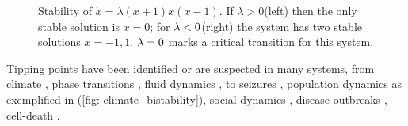 \begin{figure}[htb]
	\begin{center}
		  \qquad \qquad
	\end{center}
	\caption{Stability of $\dot{x}=\lambda (x+1)x(x-1)$. If $\lambda >0$(left) then the only stable solution is $x=0$; for $\lambda<0$(right) the system has two stable solutions $x={-1,1}$. $\lambda=0$ marks a critical transition for this system.}
	\label{fig: stability_example}
\end{figure}



Tipping points have been identified or are suspected in many systems, from climate \citep{Cai2016,Lenton2011,Boers2017}, phase transitions \citep{Fullsack2022}, fluid dynamics \citep{Lucarini2014,Yang2021}, to seizures \citep{no_cls_epileptic}, population dynamics \citep{10.1086/681573,Bathiany2016} as exemplified in (\cref{fig: climate_bistability}), social dynamics \citep{SCHEFFER2020a}, disease outbreaks \citep{doi:10.1098/rsbl.2019.0713}, cell-death \citep{Sarkar2019}.



